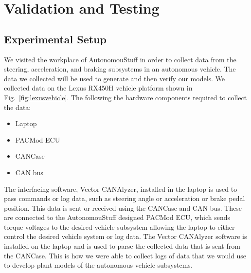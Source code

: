 \documentclass[conference]{IEEEtran}
\begin{document}
\section{Validation and Testing} \label{sec:simresults}

\subsection{Experimental Setup}
\label{sec:experimentalSetup}

We visited the workplace of AutonomouStuff in order to collect
data from the steering, acceleration, and braking subsystems in an autonomous
vehicle. The data we collected will be used to generate and then verify our
models. We collected data on the Lexus RX450H vehicle platform shown in
Fig.~\ref{fig:lexusvehicle}. %
The following  the hardware components required to collect the data:
	\begin{itemize}
    		\item Laptop
    		\item PACMod ECU
    		\item CANCase
    		\item CAN bus
 	\end{itemize}
The interfacing software, Vector CANAlyzer, installed in the laptop is used to pass commands or log data, such as steering angle or acceleration or brake pedal position. This data is sent or received using the CANCase and CAN bus. These are connected to the AutonomouStuff designed PACMod ECU, which sends torque voltages to the desired vehicle subsystem allowing the laptop to either control the desired vehicle system or log data. The Vector CANAlyzer software is installed on the laptop and is used to parse the collected data that is sent from the CANCase. This is how we were able to collect logs of data that we would use to develop plant models of the autonomous vehicle subsystems.
\end{document}
